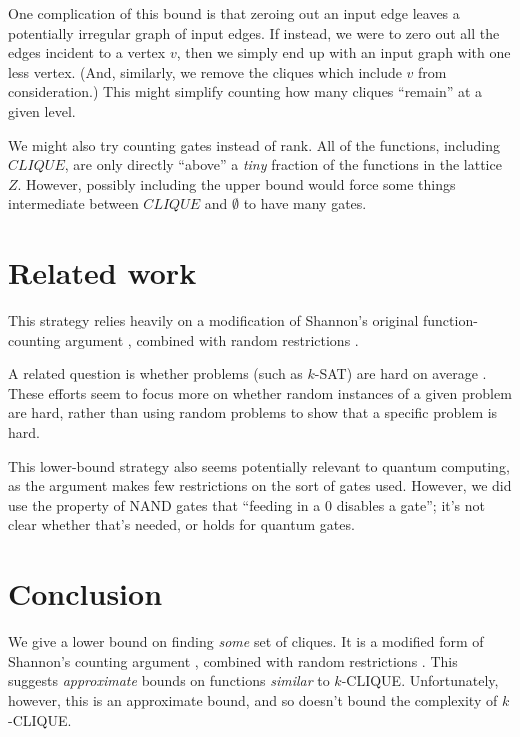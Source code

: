 \documentclass[12pt]{article}
\theoremstyle{definition}
\begin{document}
One complication of this bound is that zeroing out an input edge leaves a potentially
irregular graph of input edges. If instead, we were to zero out all the edges incident to a
vertex $v$, then we simply end up with an input graph with one less vertex.
(And, similarly, we remove the cliques which include $v$ from consideration.)
This might simplify counting how many cliques ``remain'' at a given level.

We might also try counting gates instead of rank.
All of the functions, including $CLIQUE$, are only directly
``above'' a {\em tiny} fraction of the functions
in the lattice $Z$. However, possibly including the upper bound would force some
things intermediate between $CLIQUE$ and $\emptyset$ to have many gates.

\section{Related work}

This strategy relies heavily on a modification of Shannon's original
function-counting argument \cite{shannon_synthesis_1949},
combined with random restrictions
\cite{subbotovskaya1963comparison} \cite{hastad1987lower}.

A related question is whether problems
(such as $k$-SAT) are
hard on average \cite{bogdanov2006average}.
These efforts seem to focus more on whether
random
instances of a given problem are hard, rather
than using random problems to show that
a specific problem is hard.

This lower-bound strategy also seems potentially
relevant to quantum computing,
as the argument makes few restrictions on the sort of gates used.
However, we did use the property of NAND gates that ``feeding in
a 0 disables a gate''; it's not clear whether that's needed,
or holds for quantum gates.

\section{Conclusion}

We give a lower bound on finding {\em some} set of cliques.
It is a modified form of Shannon's counting argument
\cite{shannon_synthesis_1949}, combined with random restrictions
\cite{subbotovskaya1963comparison} \cite{hastad1987lower}.
This suggests {\em approximate} bounds on functions {\em similar} to $k$-CLIQUE.
Unfortunately, however, this is an approximate bound,
and so doesn't bound the complexity of $k$-CLIQUE.
\end{document}

